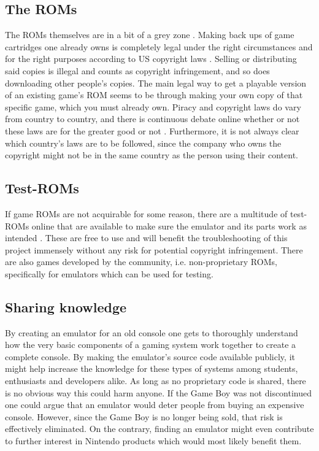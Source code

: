\subsection{The ROMs}
The ROMs themselves are in a bit of a grey zone \cite{romLegal}. Making back ups of game cartridges one already owns is completely legal under the right circumstances and for the right purposes according to US copyright laws \cite{section117}. Selling or distributing said copies is illegal and counts as copyright infringement, and so does downloading other people's copies. The main legal way to get a playable version of an existing game's ROM seems to be through making your own copy of that specific game, which you must already own. Piracy and copyright laws do vary from country to country, and there is continuous debate online whether or not these laws are for the greater good or not \cite{emulatorPodcast}. Furthermore, it is not always clear which country's laws are to be followed, since the company who owns the copyright might not be in the same country as the person using their content.

\subsection{Test-ROMs}

If game ROMs are not acquirable for some reason, there are a multitude of test-ROMs online that are available to make sure the emulator and its parts work as intended \cite{testROMs}. These are free to use and will benefit the troubleshooting of this project immensely without any risk for potential copyright infringement. There are also games developed by the community, i.e. non-proprietary ROMs, specifically for emulators which can be used for testing.


\subsection{Sharing knowledge}
By creating an emulator for an old console one gets to thoroughly understand how the very basic components of a gaming system work together to create a complete console. By making the emulator's source code available publicly, it might help increase the knowledge for these types of systems among students, enthusiasts and developers alike. As long as no proprietary code is shared, there is no obvious way this could harm anyone. If the Game Boy was not discontinued one could argue that an emulator would deter people from buying an expensive console. However, since the Game Boy is no longer being sold, that risk is effectively eliminated. On the contrary, finding an emulator might even contribute to further interest in Nintendo products which would most likely benefit them.


